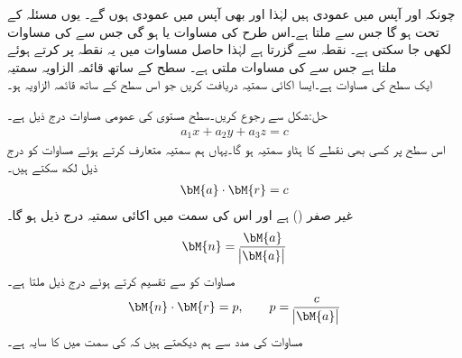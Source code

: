 چونکہ  اور  آپس میں عمودی ہیں لہٰذا  اور  بھی آپس میں عمودی ہوں گے۔ یوں مسئلہ  کے تحت   ہو گا جس سے  ملتا ہے۔اس طرح  کی مساوات  یا  ہو گی جس سے  کی مساوات  لکھی جا سکتی ہے۔  نقطہ  سے گزرتا ہے لہٰذا حاصل مساوات میں یہ نقطہ پر کرتے ہوئے  ملتا ہے جس سے  کی مساوات  ملتی ہے۔
\quad سطح کے ساتھ قائمہ الزاویہ سمتیہ\\
ایک سطح کی مساوات  ہے۔ایسا اکائی سمتیہ دریافت کریں جو اس سطح کے ساتھ قائمہ الزاویہ ہو۔

حل:شکل  سے رجوع کریں۔سطح مستوی کی عمومی مساوات درج ذیل ہے۔
\begin{align}\label{مساوات_الجبرا_سیدھی_سطح_الف}
a_1x+a_2y+a_3z=c
\end{align} 
اس سطح پر کسی بھی نقطے کا ہٹاو سمتیہ  ہو گا۔یہاں ہم سمتیہ  متعارف کرتے ہوئے  مساوات  کو درج ذیل لکھ سکتے ہیں۔
\begin{align}\label{مساوات_الجبرا_سیدھی_سطح_ب}
\bM{a}\cdot\bM{r}=c
\end{align}
 غیر صفر () ہے اور اس کی سمت میں اکائی سمتیہ  درج ذیل ہو گا۔
\begin{align*}
\bM{n}=\frac{\bM{a}}{\abs{\bM{a}}}
\end{align*}
مساوات  کو  سے تقسیم کرتے ہوئے درج ذیل ملتا ہے۔
\begin{align}
\bM{n}\cdot \bM{r}=p,\quad \quad  p=\frac{c}{\abs{\bM{a}}}
\end{align}
مساوات  کی مدد سے ہم دیکھتے ہیں کہ  کی سمت میں  کا سایہ  ہے۔

